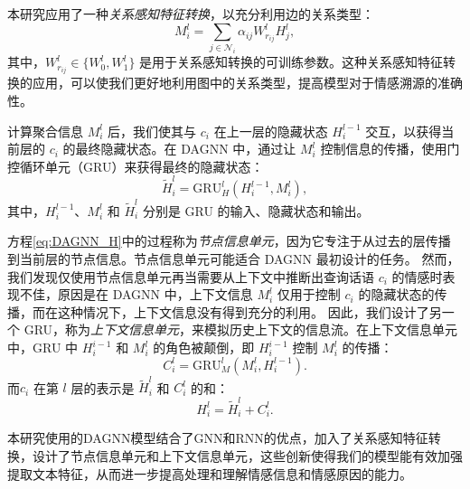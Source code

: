 本研究应用了一种\emph{关系感知特征转换}，以充分利用边的关系类型：
\vspace{3pt}  \begin{equation}
    M^l_i = \sum\limits_{j\in\mathcal{N}_i}\alpha_{ij}W_{r_{ij}}^lH^l_j,
\end{equation} \vspace{4pt}
其中，$W_{r_{ij}}^l\in\{W_0^l,W_1^l\}$ 是用于关系感知转换的可训练参数。这种关系感知特征转换的应用，可以使我们更好地利用图中的关系类型，提高模型对于情感溯源的准确性。

计算聚合信息 $M^l_i$ 后，我们使其与 $c_i$ 在上一层的隐藏状态 $H^{l-1}_i$ 交互，以获得当前层的 $c_i$ 的最终隐藏状态。在 DAGNN 中，通过让 $M^l_i$ 控制信息的传播，使用门控循环单元（GRU）来获得最终的隐藏状态：
\vspace{3pt}  \begin{equation}
\label{eq:DAGNN_H}
    \widetilde{H}^l_i = \text{GRU}^l_H(H^{l-1}_i, M^l_i),
\end{equation} \vspace{4pt}
其中，$H^{l-1}_i$、$M^l_i$ 和 $\widetilde{H}^l_i$ 分别是 GRU 的输入、隐藏状态和输出。

方程\ref{eq:DAGNN_H}中的过程称为\emph{节点信息单元}，因为它专注于从过去的层传播到当前层的节点信息。节点信息单元可能适合 DAGNN 最初设计的任务。
然而，我们发现仅使用节点信息单元再当需要从上下文中推断出查询话语 $c_i$ 的情感时表现不佳，原因是在 DAGNN 中，上下文信息 $M^l_i$ 仅用于控制 $c_i$ 的隐藏状态的传播，而在这种情况下，上下文信息没有得到充分的利用。
因此，我们设计了另一个 GRU，称为\emph{上下文信息单元}，来模拟历史上下文的信息流。在上下文信息单元中，GRU 中 $H^{i-1}_i$ 和 $M^l_i$ 的角色被颠倒，即 $H^{i-1}_i$ 控制 $M^l_i$ 的传播：
\vspace{3pt}  \begin{equation}
    C^l_i = \text{GRU}^l_M(M^{l}_i, H^{l-1}_i).
\end{equation} \vspace{3pt}
而$c_i$ 在第 $l$ 层的表示是 $\widetilde{H}^l_i$ 和 $C^l_i$ 的和：
\vspace{3pt}  \begin{equation}
    H^l_i = \widetilde{H}^l_i + C^l_i.
\end{equation} \vspace{3pt}

本研究使用的DAGNN模型结合了GNN和RNN的优点，加入了关系感知特征转换，设计了节点信息单元和上下文信息单元，这些创新使得我们的模型能有效加强提取文本特征，从而进一步提高处理和理解情感信息和情感原因的能力。


